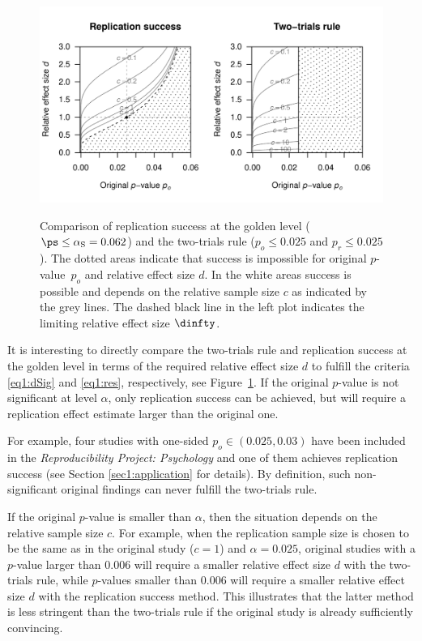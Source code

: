 \begin{figure}[!h]
\centering
\begin{knitrout}
\color{fgcolor}
{\centering \includegraphics[width=\maxwidth]{images/paper1/fig2-1}
}
\end{knitrout}
\caption{Comparison of replication success at the golden level
  ($\ps \leq \alpha_{\mathrm{S}} = 0.062$) and the two-trials rule
  (\mbox{$p_o \leq 0.025$} and $p_r \leq 0.025$). The dotted areas indicate that
  success is impossible for original \mbox{$p$-value $p_o$} and relative effect
  size $d$. In the white areas success is possible and depends on the relative
  sample size $c$ as indicated by the grey lines. The dashed black line in the
  left plot indicates the limiting relative effect size $\dinfty$. }
\label{fig1:fig2}
\end{figure}



It is interesting to directly compare the two-trials rule and replication
success at the golden level in terms of the required relative effect size $d$ to
fulfill the criteria \eqref{eq1:dSig} and \eqref{eq1:res}, respectively, see
Figure~\ref{fig1:fig2}. If the original $p$-value is not significant at level
$\alpha$, only replication success can be achieved, but will require a
replication effect estimate larger than the original one.

For example, four studies with one-sided $p_o \in (0.025, 0.03)$ have been
included in the \textit{Reproducibility Project: Psychology} \citep{Opensc2015}
and one of them achieves replication success (see Section \ref{sec1:application}
for details). By definition, such non-significant original findings can never
fulfill the two-trials rule.

If the original $p$-value is smaller than $\alpha$, then the situation depends
on the relative sample size $c$. For example, when the replication sample size
is chosen to be the same as in the original study ($c=1$) and $\alpha=0.025$,
original studies with a $p$-value larger than $0.006$ will require a smaller
relative effect size $d$ with the two-trials rule, while $p$-values smaller than
$0.006$ will require a smaller relative effect size $d$ with the replication
success method. This illustrates that the latter method is less stringent than
the two-trials rule if the original study is already sufficiently convincing.

